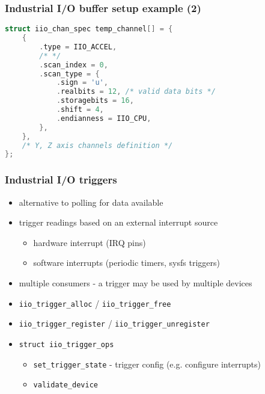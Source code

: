 \documentclass[aspectratio=169]{beamer}
\begin{document}

\begin{frame}[fragile]
\frametitle{Industrial I/O buffer setup example (2)}
\begin{lstlisting}[language=C]
struct iio_chan_spec temp_channel[] = {
    {
        .type = IIO_ACCEL,
        /* */
        .scan_index = 0,
        .scan_type = {
            .sign = 'u',
            .realbits = 12, /* valid data bits */
            .storagebits = 16,
            .shift = 4,
            .endianness = IIO_CPU,
        },
    },
    /* Y, Z axis channels definition */
};

\end{lstlisting}
\end{frame}


\begin{frame}
\frametitle{Industrial I/O triggers}
\begin{itemize}
    \item alternative to polling for data available
    \item trigger readings based on an external interrupt source
    \begin {itemize}
        \item hardware interrupt (IRQ pins)
        \item software interrupts (periodic timers, sysfs triggers)
    \end{itemize}
    \item multiple consumers - a trigger may be used by multiple devices
    \item \texttt{iio\_trigger\_alloc} / \texttt{iio\_trigger\_free}
    \item \texttt{iio\_trigger\_register} / \texttt{iio\_trigger\_unregister}
    \item \texttt{struct iio\_trigger\_ops}
    \begin{itemize}
        \item \texttt{set\_trigger\_state} - trigger config (e.g. configure interrupts)
        \item \texttt{validate\_device}
    \end{itemize}
\end{itemize}
\end{frame}

\end{document}
